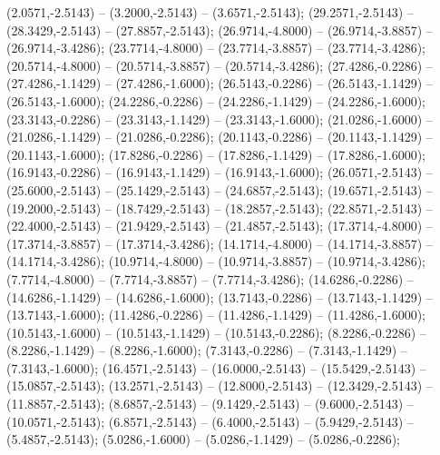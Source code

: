    (2.0571,-2.5143) -- (3.2000,-2.5143) -- (3.6571,-2.5143);
   (29.2571,-2.5143) -- (28.3429,-2.5143) -- (27.8857,-2.5143);
   (26.9714,-4.8000) -- (26.9714,-3.8857) -- (26.9714,-3.4286);
   (23.7714,-4.8000) -- (23.7714,-3.8857) -- (23.7714,-3.4286);
   (20.5714,-4.8000) -- (20.5714,-3.8857) -- (20.5714,-3.4286);
   (27.4286,-0.2286) -- (27.4286,-1.1429) -- (27.4286,-1.6000);
   (26.5143,-0.2286) -- (26.5143,-1.1429) -- (26.5143,-1.6000);
   (24.2286,-0.2286) -- (24.2286,-1.1429) -- (24.2286,-1.6000);
   (23.3143,-0.2286) -- (23.3143,-1.1429) -- (23.3143,-1.6000);
   (21.0286,-1.6000) -- (21.0286,-1.1429) -- (21.0286,-0.2286);
   (20.1143,-0.2286) -- (20.1143,-1.1429) -- (20.1143,-1.6000);
   (17.8286,-0.2286) -- (17.8286,-1.1429) -- (17.8286,-1.6000);
   (16.9143,-0.2286) -- (16.9143,-1.1429) -- (16.9143,-1.6000);
   (26.0571,-2.5143) -- (25.6000,-2.5143) -- (25.1429,-2.5143) -- (24.6857,-2.5143);
   (19.6571,-2.5143) -- (19.2000,-2.5143) -- (18.7429,-2.5143) -- (18.2857,-2.5143);
   (22.8571,-2.5143) -- (22.4000,-2.5143) -- (21.9429,-2.5143) -- (21.4857,-2.5143);
   (17.3714,-4.8000) -- (17.3714,-3.8857) -- (17.3714,-3.4286);
   (14.1714,-4.8000) -- (14.1714,-3.8857) -- (14.1714,-3.4286);
   (10.9714,-4.8000) -- (10.9714,-3.8857) -- (10.9714,-3.4286);
   (7.7714,-4.8000) -- (7.7714,-3.8857) -- (7.7714,-3.4286);
   (14.6286,-0.2286) -- (14.6286,-1.1429) -- (14.6286,-1.6000);
   (13.7143,-0.2286) -- (13.7143,-1.1429) -- (13.7143,-1.6000);
   (11.4286,-0.2286) -- (11.4286,-1.1429) -- (11.4286,-1.6000);
   (10.5143,-1.6000) -- (10.5143,-1.1429) -- (10.5143,-0.2286);
   (8.2286,-0.2286) -- (8.2286,-1.1429) -- (8.2286,-1.6000);
   (7.3143,-0.2286) -- (7.3143,-1.1429) -- (7.3143,-1.6000);
   (16.4571,-2.5143) -- (16.0000,-2.5143) -- (15.5429,-2.5143) -- (15.0857,-2.5143);
   (13.2571,-2.5143) -- (12.8000,-2.5143) -- (12.3429,-2.5143) -- (11.8857,-2.5143);
   (8.6857,-2.5143) -- (9.1429,-2.5143) -- (9.6000,-2.5143) -- (10.0571,-2.5143);
   (6.8571,-2.5143) -- (6.4000,-2.5143) -- (5.9429,-2.5143) -- (5.4857,-2.5143);
   (5.0286,-1.6000) -- (5.0286,-1.1429) -- (5.0286,-0.2286);
